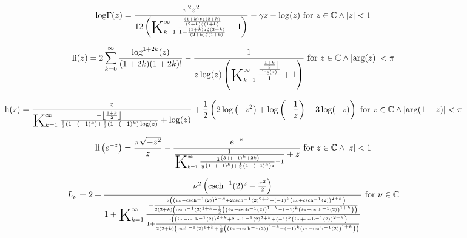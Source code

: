 \documentclass{article}
\newcommand{\bigK}{\mathop{\raisebox{-5pt}{\huge K}}}
\begin{document}
\[\text{log$\Gamma $}(z)=\frac{\pi ^2 z^2}{12 \left(\bigK_{k=1}^{\infty}\frac{\frac{(1+k) z \zeta (2+k)}{(2+k) \zeta (1+k)}}{1-\frac{(1+k) z \zeta (2+k)}{(2+k) \zeta (1+k)}}+1\right)}-\gamma  z-\log (z)\text{ for }z\in \mathbb{C}\land \left| z\right| <1\] 

\[\text{li}(z)=2 \sum _{k=0}^{\infty } \frac{\log ^{1+2 k}(z)}{(1+2 k) (1+2 k)!}-\frac{1}{z \log (z) \left(\bigK_{k=1}^{\infty}\frac{\frac{\left\lfloor \frac{1+k}{2}\right\rfloor }{\log (z)}}{1}+1\right)}\text{ for }z\in \mathbb{C}\land \left| \arg (z)\right| <\pi\] 

\[\text{li}(z)=\frac{z}{\bigK_{k=1}^{\infty}\frac{-\left\lfloor \frac{1+k}{2}\right\rfloor }{\frac{1}{2} \left(1-(-1)^k\right)+\frac{1}{2} \left(1+(-1)^k\right) \log (z)}+\log (z)}+\frac{1}{2} \left(2 \log \left(-z^2\right)+\log \left(-\frac{1}{z}\right)-3 \log (-z)\right)\text{ for }z\in \mathbb{C}\land \left| \arg (1-z)\right| <\pi\] 

\[\text{li}\left(e^{-z}\right)=\frac{\pi  \sqrt{-z^2}}{z}-\frac{e^{-z}}{\frac{1}{\bigK_{k=1}^{\infty}\frac{\frac{1}{4} \left(3+(-1)^k+2 k\right)}{\frac{1}{2} \left(1+(-1)^k\right)+\frac{1}{2} \left(1-(-1)^k\right) z}+1}+z}\text{ for }z\in \mathbb{C}\land \left| z\right| <1\] 

\[L_{\nu }=2+\frac{\nu ^2 \left(\text{csch}^{-1}(2)^2-\frac{\pi ^2}{2}\right)}{1+\bigK_{k=1}^{\infty}\frac{-\frac{\nu  \left(\left(i \pi -\text{csch}^{-1}(2)\right)^{2+k}+2 \text{csch}^{-1}(2)^{2+k}+(-1)^k \left(i \pi +\text{csch}^{-1}(2)\right)^{2+k}\right)}{2 (2+k) \left(\text{csch}^{-1}(2)^{1+k}+\frac{1}{2} \left(\left(i \pi -\text{csch}^{-1}(2)\right)^{1+k}-(-1)^k \left(i \pi +\text{csch}^{-1}(2)\right)^{1+k}\right)\right)}}{1+\frac{\nu  \left(\left(i \pi -\text{csch}^{-1}(2)\right)^{2+k}+2 \text{csch}^{-1}(2)^{2+k}+(-1)^k \left(i \pi +\text{csch}^{-1}(2)\right)^{2+k}\right)}{2 (2+k) \left(\text{csch}^{-1}(2)^{1+k}+\frac{1}{2} \left(\left(i \pi -\text{csch}^{-1}(2)\right)^{1+k}-(-1)^k \left(i \pi +\text{csch}^{-1}(2)\right)^{1+k}\right)\right)}}}\text{ for }\nu \in \mathbb{C}\] 
\end{document}
